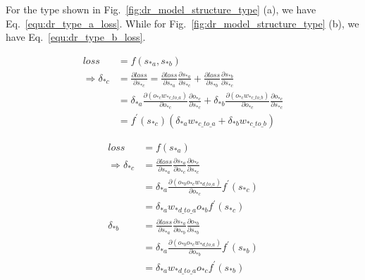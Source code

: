 \documentclass[runningheads,openany]{xhlPaper}
\begin{document}
For the type shown in Fig.~\ref{fig:dr_model_structure_type} (a), we have Eq.~\ref{equ:dr_type_a_loss}. While for Fig.~\ref{fig:dr_model_structure_type} (b), we have Eq.~\ref{equ:dr_type_b_loss}.

\begin{equation}
\label{equ:dr_type_a_loss}
\begin{aligned}
loss &= f\left( {{s_{*a}},{s_{*b}}} \right)\\
 \Rightarrow {\delta _{*c}} &= \frac{{\partial loss}}{{\partial {s_{*c}}}} = \frac{{\partial loss}}{{\partial {s_{*a}}}}\frac{{\partial {s_{*a}}}}{{\partial {s_{*c}}}} + \frac{{\partial loss}}{{\partial {s_{*b}}}}\frac{{\partial {s_{*b}}}}{{\partial {s_{*c}}}}\\
 &= {\delta _{*a}}\frac{{\partial \left( {{o_{*c}}{w_{*c\_to\_a}}} \right)}}{{\partial {o_{*c}}}}\frac{{\partial {o_{*c}}}}{{\partial {s_{*c}}}} + {\delta _{*b}}\frac{{\partial \left( {{o_{*c}}{w_{*c\_to\_b}}} \right)}}{{\partial {o_{*c}}}}\frac{{\partial {o_{*c}}}}{{\partial {s_{*c}}}}\\
 &= {f^{'}}\left( {{s_{*c}}} \right)\left( {{\delta _{*a}}{w_{*c\_to\_a}} + {\delta _{*b}}{w_{*c\_to\_b}}} \right)
\end{aligned}
\end{equation}

\begin{equation}
\label{equ:dr_type_b_loss}
\begin{aligned}
loss &= f\left( {{s_{*a}}} \right)\\
 \Rightarrow {\delta _{*c}} &= \frac{{\partial loss}}{{\partial {s_{*a}}}}\frac{{\partial {s_{*a}}}}{{\partial {o_{*c}}}}\frac{{\partial {o_{*c}}}}{{\partial {s_{*c}}}}\\
 &= {\delta _{*a}}\frac{{\partial \left( {{o_{*b}}{o_{*c}}{w_{*d\_to\_a}}} \right)}}{{\partial {o_{*c}}}}{f^{'}}\left( {{s_{*c}}} \right)\\
 &= {\delta _{*a}}{w_{*d\_to\_a}}{o_{*b}}{f^{'}}\left( {{s_{*c}}} \right)\\
{\delta _{*b}} &= \frac{{\partial loss}}{{\partial {s_{*a}}}}\frac{{\partial {s_{*a}}}}{{\partial {o_{*b}}}}\frac{{\partial {o_{*b}}}}{{\partial {s_{*b}}}}\\
 &= {\delta _{*a}}\frac{{\partial \left( {{o_{*b}}{o_{*c}}{w_{*d\_to\_a}}} \right)}}{{\partial {o_{*b}}}}{f^{'}}\left( {{s_{*b}}} \right)\\
 &= {\delta _{*a}}{w_{*d\_to\_a}}{o_{*c}}{f^{'}}\left( {{s_{*b}}} \right)
\end{aligned}
\end{equation}
\end{document}
